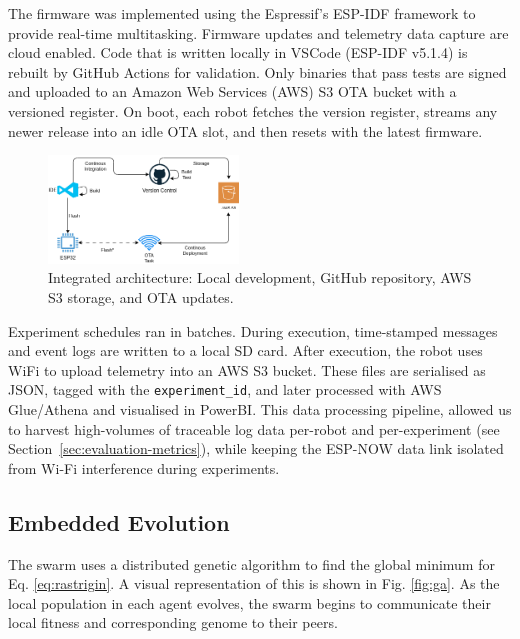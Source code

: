 \documentclass[conference]{IEEEtran}
\begin{document}
The firmware was implemented using the Espressif's ESP-IDF framework to provide real-time multitasking. Firmware updates and telemetry data capture are cloud enabled. Code that is written locally in VSCode (ESP-IDF v5.1.4) is rebuilt by GitHub Actions for validation. Only binaries that pass tests are signed and uploaded to an Amazon Web Services (AWS) S3 OTA bucket with a versioned register. On boot, each robot fetches the version register, streams any newer release into an idle OTA slot, and then resets with the latest firmware.

\begin{figure}[hb]
    \centering
    \includegraphics[width=0.45\textwidth]{architecture.png}
    \caption{Integrated architecture: Local development, GitHub repository, AWS S3 storage, and OTA updates.}
    \label{fig:cicd-architecture}
\end{figure}

Experiment schedules ran in batches. During execution, time-stamped messages and event logs are written to a local SD card. After execution, the robot uses WiFi to upload telemetry into an AWS S3 bucket. These files are serialised as JSON, tagged with the \texttt{experiment\_id}, and later processed with AWS Glue/Athena and visualised in PowerBI. This data processing pipeline, allowed us to harvest high-volumes of traceable log data per-robot and per-experiment (see Section~\ref{sec:evaluation-metrics}), while keeping the ESP-NOW data link isolated from Wi-Fi interference during experiments.


\subsection{Embedded Evolution}\label{sec:embedded-evo}

The swarm uses a distributed genetic algorithm to find the global minimum for Eq. \ref{eq:rastrigin}. A visual representation of this is shown in Fig. \ref{fig:ga}. As the local population in each agent evolves, the swarm begins to communicate their local fitness and corresponding genome to their peers. \\
\end{document}
